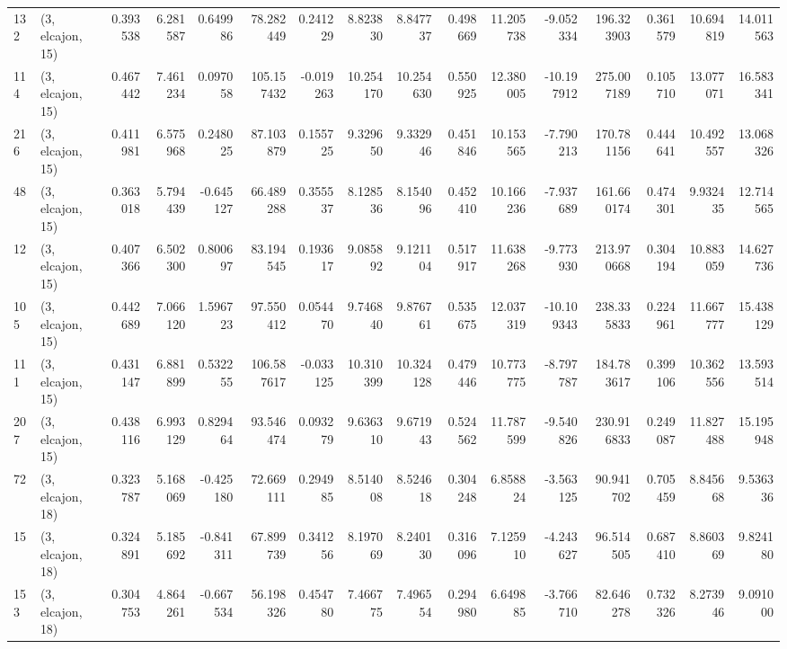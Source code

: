 \begin{tabular}{llrrrrrrrrrrrrrr}
132 &  (3, elcajon, 15) &   0.393538 &   6.281587 &  0.649986 &   78.282449 &  0.241229 &   8.823830 &   8.847737 &  0.498669 &  11.205738 &  -9.052334 &  196.323903 &  0.361579 &  10.694819 &  14.011563 \\
114 &  (3, elcajon, 15) &   0.467442 &   7.461234 &  0.097058 &  105.157432 & -0.019263 &  10.254170 &  10.254630 &  0.550925 &  12.380005 & -10.197912 &  275.007189 &  0.105710 &  13.077071 &  16.583341 \\
216 &  (3, elcajon, 15) &   0.411981 &   6.575968 &  0.248025 &   87.103879 &  0.155725 &   9.329650 &   9.332946 &  0.451846 &  10.153565 &  -7.790213 &  170.781156 &  0.444641 &  10.492557 &  13.068326 \\
48  &  (3, elcajon, 15) &   0.363018 &   5.794439 & -0.645127 &   66.489288 &  0.355537 &   8.128536 &   8.154096 &  0.452410 &  10.166236 &  -7.937689 &  161.660174 &  0.474301 &   9.932435 &  12.714565 \\
12  &  (3, elcajon, 15) &   0.407366 &   6.502300 &  0.800697 &   83.194545 &  0.193617 &   9.085892 &   9.121104 &  0.517917 &  11.638268 &  -9.773930 &  213.970668 &  0.304194 &  10.883059 &  14.627736 \\
105 &  (3, elcajon, 15) &   0.442689 &   7.066120 &  1.596723 &   97.550412 &  0.054470 &   9.746840 &   9.876761 &  0.535675 &  12.037319 & -10.109343 &  238.335833 &  0.224961 &  11.667777 &  15.438129 \\
111 &  (3, elcajon, 15) &   0.431147 &   6.881899 &  0.532255 &  106.587617 & -0.033125 &  10.310399 &  10.324128 &  0.479446 &  10.773775 &  -8.797787 &  184.783617 &  0.399106 &  10.362556 &  13.593514 \\
207 &  (3, elcajon, 15) &   0.438116 &   6.993129 &  0.829464 &   93.546474 &  0.093279 &   9.636310 &   9.671943 &  0.524562 &  11.787599 &  -9.540826 &  230.916833 &  0.249087 &  11.827488 &  15.195948 \\
72  &  (3, elcajon, 18) &   0.323787 &   5.168069 & -0.425180 &   72.669111 &  0.294985 &   8.514008 &   8.524618 &  0.304248 &   6.858824 &  -3.563125 &   90.941702 &  0.705459 &   8.845668 &   9.536336 \\
15  &  (3, elcajon, 18) &   0.324891 &   5.185692 & -0.841311 &   67.899739 &  0.341256 &   8.197069 &   8.240130 &  0.316096 &   7.125910 &  -4.243627 &   96.514505 &  0.687410 &   8.860369 &   9.824180 \\
153 &  (3, elcajon, 18) &   0.304753 &   4.864261 & -0.667534 &   56.198326 &  0.454780 &   7.466775 &   7.496554 &  0.294980 &   6.649885 &  -3.766710 &   82.646278 &  0.732326 &   8.273946 &   9.091000 \\

\end{tabular}
